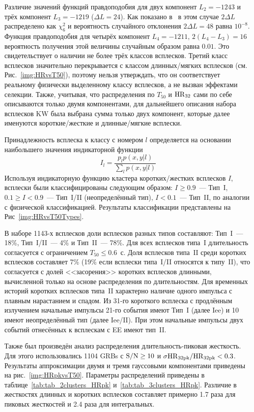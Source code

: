 Различие значений функций правдоподобия для двух компонент $L_2 = -1243$ и трёх 
компонент $L_3 = -1219$ ($\Delta L = 24$). Как показано в~\citep{Horvath_2006} 
в этом случае $2\Delta L$ распределено как $\chi^2_6$ и вероятность случайного 
отклонения $2\Delta L = 48$ равна $10^{-8}$. Функция правдоподобия для четырёх 
компонент $L_4 = -1211$, $2(L_4 - L_3) = 16$ вероятность получения этой величины случайным образом равна $0.01$. 
Это свидетельствует о наличии не более трёх классов всплесков. Третий класс всплесков 
значительно перекрывается с классом длинных/мягких всплесков (см. Рис.~\ref{img:HRvsT50}), поэтому нельзя утверждать, 
что он соответствует реальному физически выделенному классу всплесков, а не вызван эффектами селекции. 
Также, учитывая, что распределения по $T_{50}$ и ${\mathrm{HR}}_{32}$ сами по себе описываются 
только двумя компонентами, для дальнейшего описания набора всплесков KW была выбрана
сумма только двух компонент, которые далее именуются короткие/жесткие и длинные/мягкие всплески.

Принадлежность всплеска к классу с номером $l$ определяется на основании наибольшего 
значения индикаторной функции
\begin{equation}
I_l =\frac{p_l p(x,y|l)}{\sum_l  p(x, y|l)}
\end{equation}
Используя индикаторную функцию кластера коротких/жестких всплесков $I$, 
всплески были классифицированы следующим образом: 
$I \geq 0.9$~--- Тип~I, $0.1 \geq I < 0.9$~--- Тип~I/II (неопределённый тип), 
$I < 0.1$~--- Тип~II, по аналогии с физической классификацией. 
Результаты классификации представлены на Рис~\ref{img:HRvsT50Types}.

В наборе 1143-х всплесков доли всплесков разных типов составляют: Тип~I~--- 18\%,
Тип~I/II~--- 4\% и Тип~II~--- 78\%. Для всех всплесков типа~I длительность согласуется 
с ограничением $T_{50} \leq 0.6$~с. Доля всплесков типа~II среди коротких всплесков 
составляет 7\% (19\% если всплески типа~I/II относятся к типу~II), что согласуется с долей
<<засорения>> коротких всплесков длинными, вычисленной только на основе распределения 
по длительностям. Для временных историй коротких всплесков типа~II характерно 
наличие одного импульса с плавным нарастанием и спадом.
Из 31-го короткого всплеска с продлённым излучением начальные импульсы 21-го события 
имеют Тип~I (далее Iee) и 10 имеют неопределённый тип (далее Iee/II).
При этом начальные импульсы двух событий отнесённых к всплескам с EE имеют тип~II.   %

Также был произведён анализ распределения длительность-пиковая жесткость. 
Для этого использовались 1104 GRBs с ${\mathrm{S/N}} \geq 10$ и $\sigma {\mathrm{HR}}_{32{\mathrm{pk}}}/{\mathrm{HR}}_{32{\mathrm{pk}}} <0.3$. 
Результаты аппроксимации двумя и тремя гауссовыми компонентами приведены на рис.~\ref{img:HRpkvsT50}. 
Параметры распределений приведены в таблице~\ref{tab:tab_2clusters_HRpk} и~\ref{tab:tab_3clusters_HRpk}. 
Различие в жесткостях длинных и коротких всплесков составляет примерно 1.7 раза для пиковых 
жесткостей и 2.4 раза для интегральных. 

